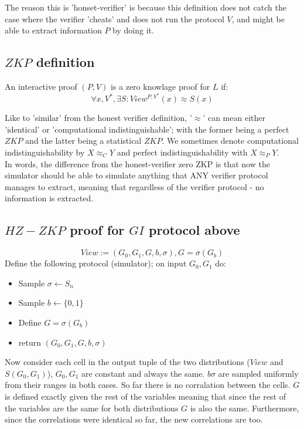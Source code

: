 The reason this is 'honset-verifier' is because this definition
does not catch the case where the verifier 'cheats' and does not
run the protocol $V$, and might be able to extract information $P$ by doing it.


\subsection*{$ZKP$ definition}
An interactive proof $(P,V)$ is a zero knowlage proof for $L$
if:
\[\forall x,V^*,\exists S: View^{P,V^*}(x)\approx S(x)\]

Like to 'similar' from the honest verifier definition,
'$\approx$' can mean either 'identical' or 'computational indistinguishable';
with the former being a perfect $ZKP$ and the latter being a statistical $ZKP$. We sometimes denote computational indistinguishability by $X\approx_CY$
and perfect indistinguishability with $X\approx_PY$.\\

In words, the difference from the honest-verifier zero ZKP is
that now the simulator should be able to simulate anything that
ANY verifier protocol manages to extract, meaning that regardless
of the verifier protocol - no information is extracted.

\subsection*{$HZ-ZKP$ proof for $GI$ protocol above}
\[
	View:=(G_0,G_1,G,b,\sigma), G=\sigma(G_b)	
\]
Define the following protocol (simulator); on input $G_0, G_1$ do:
\begin{itemize}
	\item Sample $\sigma \leftarrow S_n$
	\item Sample $b\leftarrow \{0,1\}$
	\item Define $G=\sigma(G_b)$
	\item return $(G_0, G_1, G, b, \sigma)$
\end{itemize}
Now consider each cell in the output tuple of the two distributions ($View$ and $S(G_0,G_1)$),
$G_0,G_1$ are constant and always the same. $b\sigma$ are sampled uniformly from
their ranges in both cases.
So far there is no corralation between the cells.
$G$ is defined exactly given the rest of the variables meaning
that since the rest of the variables are the same for both distributions
$G$ is also the same. Furthermore, since the correlations were identical so far,
the new correlations are too.

